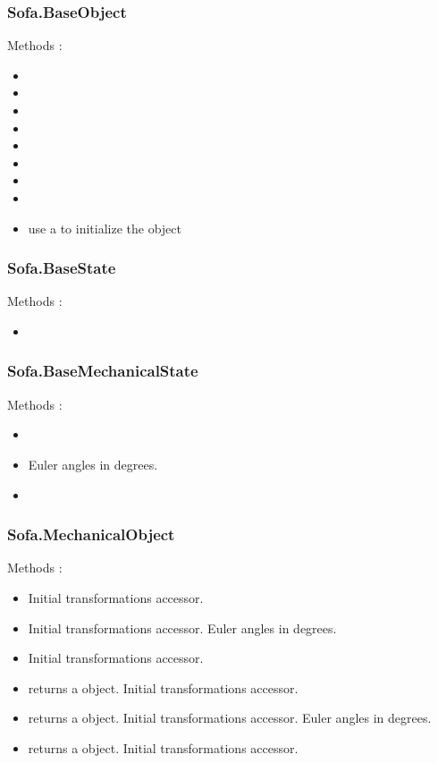\subsubsection{Sofa.BaseObject}
Methods :
\begin{itemize}
\item {}
\item {}
\item {}
\item {}
\item {}
\item {}
\item {}
\item {}
\item {} use a  to initialize the object
\end{itemize}

\subsubsection{Sofa.BaseState}
Methods :
\begin{itemize}
\item {}
\end{itemize}

\subsubsection{Sofa.BaseMechanicalState}
Methods :
\begin{itemize}
\item {}
\item {} Euler angles in degrees.
\item {} 
\end{itemize}

\subsubsection{Sofa.MechanicalObject}
Methods :
\begin{itemize}
\item {} Initial transformations accessor.
\item {} Initial transformations accessor. Euler angles in degrees.
\item {} Initial transformations accessor.
\item {} returns a  object. Initial transformations accessor.
\item {} returns a  object. Initial transformations accessor. Euler angles in degrees.
\item {} returns a  object. Initial transformations accessor.
\end{itemize}

